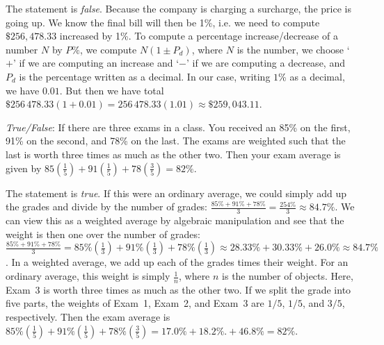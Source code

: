 \documentclass[11pt,letterpaper]{article}
\begin{document}
\sol The statement is \textit{false}. Because the company is charging a surcharge, the price is going up. We know the final bill will then be 1\%, i.e. we need to compute $\$256,478.33$ increased by 1\%. To compute a percentage increase/decrease of a number $N$ by $P\%$, we compute $N( 1 \pm P_d)$, where $N$ is the number, we choose `$+$' if we are computing an increase and `$-$' if we are computing a decrease, and $P_d$ is the percentage written as a decimal. In our case, writing $1$\% as a decimal, we have $0.01$. But then we have total $\$256\,478.33(1 + 0.01)= 256\,478.33(1.01) \approx \$259,043.11$.





\newpage





\quizsol \textit{True/False}: If there are three exams in a class. You received an 85\% on the first, 91\% on the second, and 78\% on the last. The exams are weighted such that the last is worth three times as much as the other two. Then your exam average is given by $85 \left( \frac{1}{5} \right) + 91 \left( \frac{1}{5} \right) + 78 \left( \frac{3}{5} \right)= 82\%$. \pspace

\sol The statement is \textit{true}. If this were an ordinary average, we could simply add up the grades and divide by the number of grades: $\frac{85\% + 91\% + 78\%}{3}= \frac{254\%}{3} \approx 84.7\%$. We can view this as a weighted average by algebraic manipulation and see that the weight is then one over the number of grades: $\frac{85\% + 91\% + 78\%}{3}= 85\% (\frac{1}{3}) + 91\% (\frac{1}{3}) + 78\% (\frac{1}{3}) \approx 28.33\% + 30.33\% + 26.0\% \approx 84.7\%$. In a weighted average, we add up each of the grades times their weight. For an ordinary average, this weight is simply $\frac{1}{n}$, where $n$ is the number of objects. Here, Exam~3 is worth three times as much as the other two. If we split the grade into five parts, the weights of Exam~1, Exam~2, and Exam~3 are $1/5$, $1/5$, and $3/5$, respectively. Then the exam average is $85\% (\frac{1}{5}) + 91\% (\frac{1}{5}) + 78\% (\frac{3}{5})= 17.0\% + 18.2\%.+ 46.8\%= 82\%$. 


\end{document}
